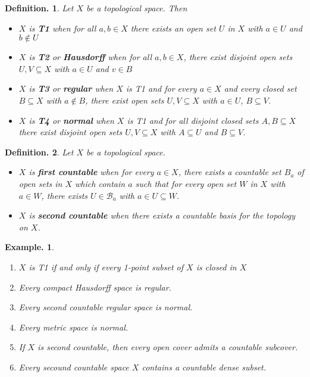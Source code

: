 \documentclass[11pt, a4paper]{memoir}
\theoremstyle{change}
\theoremstyle{plain}
\theoremstyle{nonumberplain}
\newtheorem{definition}{Definition.}
\newtheorem{example}{Example.}
\numberwithin{equation}{section}
\begin{document}
\begin{definition}
    Let $X$ be a topological space.
    Then
    \begin{itemize}[nl]
        \item $X$ is \textbf{T1} when for all $a,b\in X$ there exists an open set $U$ in $X$ with $a\in U$ and $b\notin U$
        \item $X$ is \textbf{T2} or \textbf{Hausdorff} when for all $a,b\in X$, there exist disjoint open sets $U,V\subseteq X$ with $a\in U$ and $v\in B$
        \item $X$ is \textbf{T3} or \textbf{regular} when $X$ is T1 and for every $a\in X$ and every closed set $B\subseteq X$ with $a\notin B$, there exist open sets $U,V\subseteq X$ with $a\in U$, $B\subseteq V$.
        \item $X$ is \textbf{T4} or \textbf{normal} when $X$ is T1 and for all disjoint closed sets $A,B\subseteq X$ there exist disjoint open sets $U,V\subseteq X$ with $A\subseteq U$ and $B\subseteq V$.
    \end{itemize}
\end{definition}
\begin{definition}
    Let $X$ be a topological space.
    \begin{itemize}[nl]
        \item $X$ is \textbf{first countable} when for every $a\in X$, there exists a countable set $B_a$ of open sets in $X$ which contain $a$ such that for every open set $W$ in $X$ with $a\in W$, there exists $U\in\mathcal{B}_a$ with $a\in U\subseteq W$.
        \item $X$ is \textbf{second countable} when there exists a countable basis for the topology on $X$.
    \end{itemize}
\end{definition}
\begin{example}
    \begin{enumerate}[nl,r]
        \item $X$ is T1 if and only if every 1-point subset of $X$ is closed in $X$
        \item Every compact Hausdorff space is regular.
        \item Every second countable regular space is normal.
        \item Every metric space is normal.
        \item If $X$ is second countable, then every open cover admits a countable subcover.
        \item Every secound countable space $X$ contains a countable dense subset.
    \end{enumerate}
\end{example}
\end{document}

